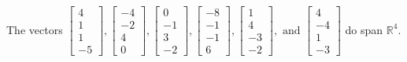 \begin{exercise}
\begin{exerciseStatement}
  \end{exerciseStatement}
  \begin{exerciseAnswer}
   The vectors \(\left[\begin{array}{r}
4 \\
1 \\
1 \\
-5
\end{array}\right] , \left[\begin{array}{r}
-4 \\
-2 \\
4 \\
0
\end{array}\right] , \left[\begin{array}{r}
0 \\
-1 \\
3 \\
-2
\end{array}\right] , \left[\begin{array}{r}
-8 \\
-1 \\
-1 \\
6
\end{array}\right] , \left[\begin{array}{r}
1 \\
4 \\
-3 \\
-2
\end{array}\right] , \text{ and } \left[\begin{array}{r}
4 \\
-4 \\
1 \\
-3
\end{array}\right]\) 
  	 do  
	span \(\mathbb{R}^4\).
  


  \end{exerciseAnswer}
\end{exercise}